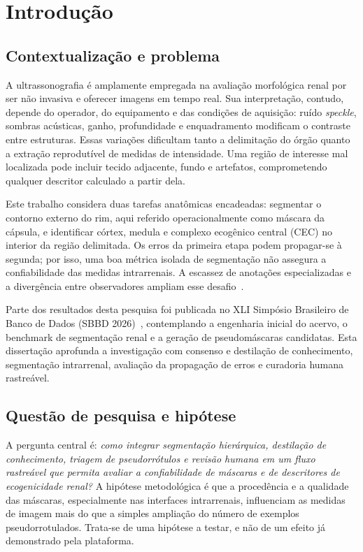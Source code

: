 \documentclass[12pt]{article}
\begin{document}
\section{Introdução}
\subsection{Contextualização e problema}
A ultrassonografia é amplamente empregada na avaliação morfológica renal por ser não invasiva e oferecer imagens em tempo real. Sua interpretação, contudo, depende do operador, do equipamento e das condições de aquisição: ruído \textit{speckle}, sombras acústicas, ganho, profundidade e enquadramento modificam o contraste entre estruturas. Essas variações dificultam tanto a delimitação do órgão quanto a extração reprodutível de medidas de intensidade. Uma região de interesse mal localizada pode incluir tecido adjacente, fundo e artefatos, comprometendo qualquer descritor calculado a partir dela.

Este trabalho considera duas tarefas anatômicas encadeadas: segmentar o contorno externo do rim, aqui referido operacionalmente como máscara da cápsula, e identificar córtex, medula e complexo ecogênico central (CEC) no interior da região delimitada. Os erros da primeira etapa podem propagar-se à segunda; por isso, uma boa métrica isolada de segmentação não assegura a confiabilidade das medidas intrarrenais. A escassez de anotações especializadas e a divergência entre observadores ampliam esse desafio~\cite{Singla2023KidneyUS,Taha2015Metrics}.

Parte dos resultados desta pesquisa foi publicada no XLI Simpósio Brasileiro de Banco de Dados (SBBD 2026)~\cite{Anjos2026SBBD}, contemplando a engenharia inicial do acervo, o benchmark de segmentação renal e a geração de pseudomáscaras candidatas. Esta dissertação aprofunda a investigação com consenso e destilação de conhecimento, segmentação intrarrenal, avaliação da propagação de erros e curadoria humana rastreável.

\subsection{Questão de pesquisa e hipótese}
A pergunta central é: \textit{como integrar segmentação hierárquica, destilação de conhecimento, triagem de pseudorrótulos e revisão humana em um fluxo rastreável que permita avaliar a confiabilidade de máscaras e de descritores de ecogenicidade renal?} A hipótese metodológica é que a procedência e a qualidade das máscaras, especialmente nas interfaces intrarrenais, influenciam as medidas de imagem mais do que a simples ampliação do número de exemplos pseudorrotulados. Trata-se de uma hipótese a testar, e não de um efeito já demonstrado pela plataforma.
\end{document}
